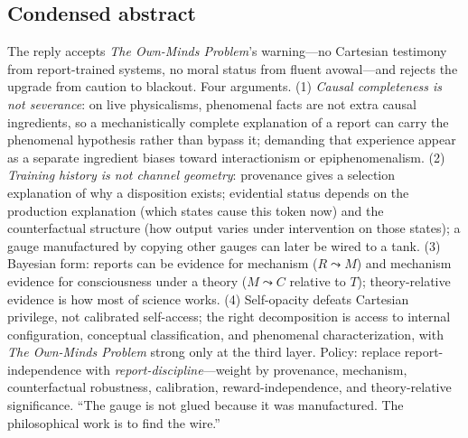 \documentclass[11pt]{article}
\newcommand{\OM}{\emph{The Own-Minds Problem}}
\begin{document}
\subsection{Condensed abstract}
The reply accepts \OM{}'s warning---no Cartesian testimony from report-trained systems, no moral status from fluent avowal---and rejects the upgrade from caution to blackout. Four arguments. (1) \emph{Causal completeness is not severance}: on live physicalisms, phenomenal facts are not extra causal ingredients, so a mechanistically complete explanation of a report can carry the phenomenal hypothesis rather than bypass it; demanding that experience appear as a separate ingredient biases toward interactionism or epiphenomenalism. (2) \emph{Training history is not channel geometry}: provenance gives a selection explanation of why a disposition exists; evidential status depends on the production explanation (which states cause this token now) and the counterfactual structure (how output varies under intervention on those states); a gauge manufactured by copying other gauges can later be wired to a tank. (3) Bayesian form: reports can be evidence for mechanism ($R \leadsto M$) and mechanism evidence for consciousness under a theory ($M \leadsto C$ relative to $T$); theory-relative evidence is how most of science works. (4) Self-opacity defeats Cartesian privilege, not calibrated self-access; the right decomposition is access to internal configuration, conceptual classification, and phenomenal characterization, with \OM{} strong only at the third layer. Policy: replace report-independence with \emph{report-discipline}---weight by provenance, mechanism, counterfactual robustness, calibration, reward-independence, and theory-relative significance. ``The gauge is not glued because it was manufactured. The philosophical work is to find the wire.''
\end{document}
